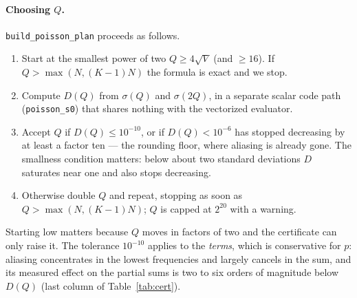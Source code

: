 \documentclass[11pt]{article}
\begin{document}
\paragraph{Choosing $Q$.} \texttt{build\_poisson\_plan} proceeds as follows.
\begin{enumerate}
  \item Start at the smallest power of two $Q\ge4\sqrt V$ (and $\ge16$). If
        $Q>\max(N,(K-1)N)$ the formula is exact and we stop.
  \item Compute $D(Q)$ from $\sigma(Q)$ and $\sigma(2Q)$, in a separate scalar code path
        (\texttt{poisson\_s0}) that shares nothing with the vectorized evaluator.
  \item Accept $Q$ if $D(Q)\le10^{-10}$, or if $D(Q)<10^{-6}$ has stopped decreasing by at least a
        factor ten --- the rounding floor, where aliasing is already gone. The smallness condition
        matters: below about two standard deviations $D$ saturates near one and also stops
        decreasing.
  \item Otherwise double $Q$ and repeat, stopping as soon as $Q>\max(N,(K-1)N)$; $Q$ is capped at
        $2^{20}$ with a warning.
\end{enumerate}
Starting low matters because $Q$ moves in factors of two and the certificate can only raise it. The
tolerance $10^{-10}$ applies to the \emph{terms}, which is conservative for $p$: aliasing
concentrates in the lowest frequencies and largely cancels in the sum, and its measured effect on
the partial sums is two to six orders of magnitude below $D(Q)$ (last column of
Table~\ref{tab:cert}).
\end{document}
